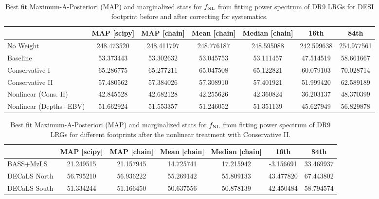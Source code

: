 \begin{table}
  \begin{center}
    \caption{Best fit Maximum-A-Posteriori (MAP) and marginalized stats for $f_{\rm NL}$ from fitting power spectrum of DR9 LRGs for DESI footprint before and after correcting for systematics.}
    \label{tab:dr9mcmc}
    \begin{tabular}{lcccccc}
    \hline
    \hline
    & MAP [scipy] & MAP [chain]  &	Mean [chain]	& Median [chain] &	16th	& 84th \\
    \hline
No Weight&	248.473520	&248.411797	&248.776187	&248.595088&	242.599638&	254.977561\\
Baseline	&53.373443	&53.302632	&53.045753	&53.111457	&47.514519	&58.661667\\
Conservative I	&65.286775	&65.277211	&65.047508&	65.122821&	60.079103&	70.028714\\
Conservative II	&57.480562	&57.384026	&57.308910&	57.401921&	51.999420&	62.589189\\
Nonlinear (Cons. II)	&42.845528	&42.682128	&42.255626&	42.360824&	36.203137&	48.370399 \\
Nonlinear (Depths+EBV)	&51.662924 &	51.553357&	51.246052&	51.351139	 & 45.627949&	56.829878

    \end{tabular}
  \end{center}
\end{table}


\begin{table}
  \begin{center}
    \caption{Best fit Maximum-A-Posteriori (MAP) and marginalized stats for $f_{\rm NL}$ from fitting power spectrum of DR9 LRGs  for different footprints after the nonlinear treatment with Conservative II.}
    \label{tab:dr9mcmc}
    \begin{tabular}{lcccccc}
    \hline
    \hline
    & MAP [scipy] & MAP [chain]  &	Mean [chain]	& Median [chain] &	16th	& 84th \\
    \hline
BASS+MzLS&	21.249515&	21.157945&	14.725741&	17.215942&	-3.156691&	33.469937\\
DECaLS North&	56.795210&	56.936222&	55.269142&	55.809133&	43.477820&	67.443802\\
DECaLS South &	51.334244&	51.166450&	50.637556&	50.878139&	42.450484&	58.794574
    \end{tabular}
  \end{center}
\end{table}




%
